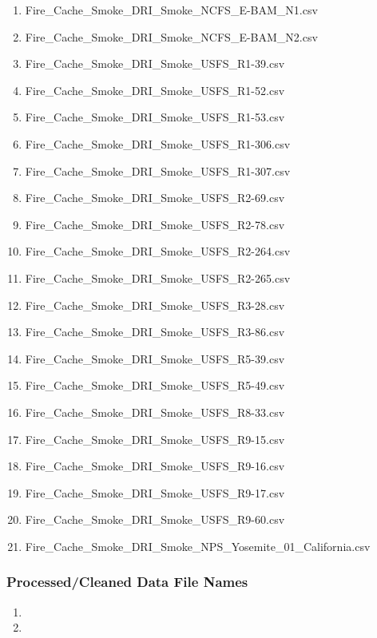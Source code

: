 \begin{enumerate}[nolistsep]
\item Fire\_Cache\_Smoke\_DRI\_Smoke\_NCFS\_E-BAM\_N1.csv
\item Fire\_Cache\_Smoke\_DRI\_Smoke\_NCFS\_E-BAM\_N2.csv
\item Fire\_Cache\_Smoke\_DRI\_Smoke\_USFS\_R1-39.csv
\item Fire\_Cache\_Smoke\_DRI\_Smoke\_USFS\_R1-52.csv
\item Fire\_Cache\_Smoke\_DRI\_Smoke\_USFS\_R1-53.csv
\item Fire\_Cache\_Smoke\_DRI\_Smoke\_USFS\_R1-306.csv
\item Fire\_Cache\_Smoke\_DRI\_Smoke\_USFS\_R1-307.csv
\item Fire\_Cache\_Smoke\_DRI\_Smoke\_USFS\_R2-69.csv
\item Fire\_Cache\_Smoke\_DRI\_Smoke\_USFS\_R2-78.csv
\item Fire\_Cache\_Smoke\_DRI\_Smoke\_USFS\_R2-264.csv
\item Fire\_Cache\_Smoke\_DRI\_Smoke\_USFS\_R2-265.csv
\item Fire\_Cache\_Smoke\_DRI\_Smoke\_USFS\_R3-28.csv
\item Fire\_Cache\_Smoke\_DRI\_Smoke\_USFS\_R3-86.csv
\item Fire\_Cache\_Smoke\_DRI\_Smoke\_USFS\_R5-39.csv
\item Fire\_Cache\_Smoke\_DRI\_Smoke\_USFS\_R5-49.csv
\item Fire\_Cache\_Smoke\_DRI\_Smoke\_USFS\_R8-33.csv
\item Fire\_Cache\_Smoke\_DRI\_Smoke\_USFS\_R9-15.csv
\item Fire\_Cache\_Smoke\_DRI\_Smoke\_USFS\_R9-16.csv
\item Fire\_Cache\_Smoke\_DRI\_Smoke\_USFS\_R9-17.csv
\item Fire\_Cache\_Smoke\_DRI\_Smoke\_USFS\_R9-60.csv
\item Fire\_Cache\_Smoke\_DRI\_Smoke\_NPS\_Yosemite\_01\_California.csv

\end{enumerate}

\subsubsection*{Processed/Cleaned Data File Names}

\begin{enumerate}[nolistsep]
\item
\item
\end{enumerate}

